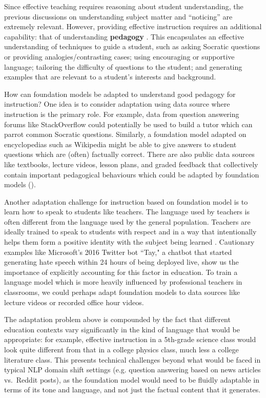 Since effective teaching requires reasoning about student understanding, the previous discussions on understanding subject matter and ``noticing'' are extremely relevant. However, providing effective instruction requires an additional capability: that of understanding \textbf{pedagogy} \cite{mckenzie2003pedagogy}. This encapsulates an effective understanding of techniques to guide a student, such as asking Socratic questions or providing analogies/contrasting cases; using encouraging or supportive language; tailoring the difficulty of questions to the student; and generating examples that are relevant to a student's interests and background.

How can foundation models be adapted to understand good pedagogy for instruction? One idea is to consider adaptation using data source where instruction is the primary role. For example, data from question answering forums like StackOverflow could potentially be used to build a tutor which can parrot common Socratic questions. Similarly, a foundation model adapted on encyclopedias such as Wikipedia might be able to give answers to student questions which are (often) factually correct. There are also public data sources like textbooks, lecture videos, lesson plans, and graded feedback that collectively contain important pedagogical behaviours which could be adapted by foundation models ().

Another adaptation challenge for instruction based on foundation model is to learn how to speak to students like teachers. The language used by teachers is often different from the language used by the general population. Teachers are ideally trained to speak to students with respect and in a way that intentionally helps them form a positive identity with the subject being learned \cite{truax2018edlang}. Cautionary examples like Microsoft's 2016 Twitter bot ``Tay," a chatbot that started generating hate speech within 24 hours of being deployed live, show us the importance of explicitly accounting for this factor in education. To train a language model which is more heavily influenced by professional teachers in classrooms, we could perhaps adapt foundation models to data sources like lecture videos or recorded office hour videos.

The adaptation problem above is compounded by the fact that different education contexts vary significantly in the kind of language that would be appropriate: for example, effective instruction in a 5th-grade science class would look quite different from that in a college physics class, much less a college literature class. This presents technical challenges beyond what would be faced in typical NLP domain shift settings (e.g. question answering based on news articles vs.~Reddit posts), as the foundation model would need to be fluidly adaptable in terms of its tone and language, and not just the factual content that it generates.

